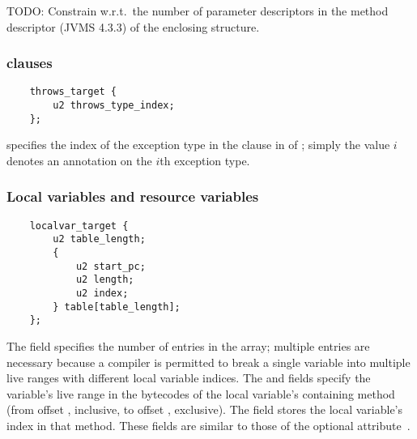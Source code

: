 \documentclass[10pt]{article}
\begin{document}

TODO: Constrain  w.r.t.\ the number of
      parameter descriptors in the method descriptor (JVMS 4.3.3) of the
      enclosing  structure.


\subsubsection{ clauses\label{class-file:ext:ri:throws}}


\preverbnegspace
\begin{Verbatim}
    throws_target {
        u2 throws_type_index;
    };
\end{Verbatim}

 specifies the index of the exception type in the
clause in  of ;
simply the value $i$ denotes an annotation on the $i$th exception
type.



\subsubsection{Local variables and resource variables\label{class-file:ext:ri:localvar}}


\preverbnegspace
\begin{Verbatim}
    localvar_target {
        u2 table_length;
        {
            u2 start_pc;
            u2 length;
            u2 index;
        } table[table_length];
    };
\end{Verbatim}

The  field specifies the number of entries in the
 array; multiple entries are necessary because a compiler is
permitted to break a single variable into multiple live ranges with different
local variable indices.
The  and  fields specify the variable's
live range in the bytecodes of the local variable's containing method
(from offset , inclusive, to offset , exclusive).  The
 field stores the local variable's index in that method.
These fields are similar to those of the optional
 attribute~\cite[\S 4.8.12]{LindholmYBB2012}.
\end{document}
